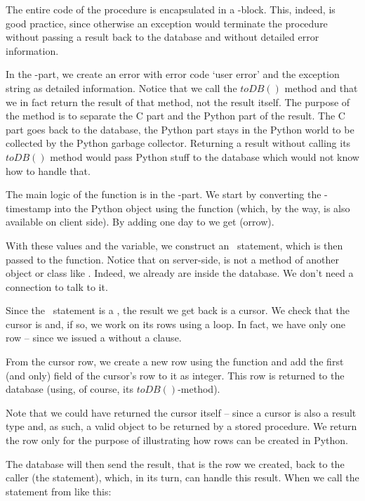 The entire code of the procedure is encapsulated
in a -block. This, indeed, is
good practice, since otherwise
an exception would terminate the procedure without
passing a result back to the database and without
detailed error information.

In the -part, we create
an error with error code `user error' and
the exception string as detailed information.
Notice that we call the $toDB()$ method
and that we in fact return the result of that
method, not the result itself.
The purpose of the method is to separate
the C part and the Python part of the result.
The C part goes back to the database,
the Python part stays in the Python world
to be collected by the Python garbage collector.
Returning a result without calling its $toDB()$
method would pass Python stuff
to the database which would not know how to handle
that.

The main logic of the function
is in the -part.
We start by converting the \nowdb-timestamp
into the Python  object 
using the  function
(which, by the way,
is also available on client side).
By adding one day to  we get
(orrow).

With these values and the 
variable, we construct an \sql\ statement,
which is then passed to the 
function. Notice that on server-side,
 is not a method of another
object or class like .
Indeed, we already are inside the database.
We don't need a connection to talk to it.

Since the \sql\ statement
is a , the result we get
back is a cursor. We check that the cursor
is  and, if so, we work on
its rows using a  loop.
In fact, we have only
one row -- since we issued a 
without a  clause.

From the cursor row, we create a new row
using the  function
and add the first (and only) field 
of the cursor's row to it as integer. This row
is returned to the database (using,
of course, its $toDB()$-method).

Note that we could have returned the cursor itself --
since a cursor is also a result type and, as such,
a valid object to be returned by a stored procedure.
We return the row only for the purpose of illustrating
how rows can be created in Python.

The database will then send the result,
that is the row we created,
back to the caller (the  statement),
which, in its turn, can handle this result.
When we call the  statement
from  like this:

